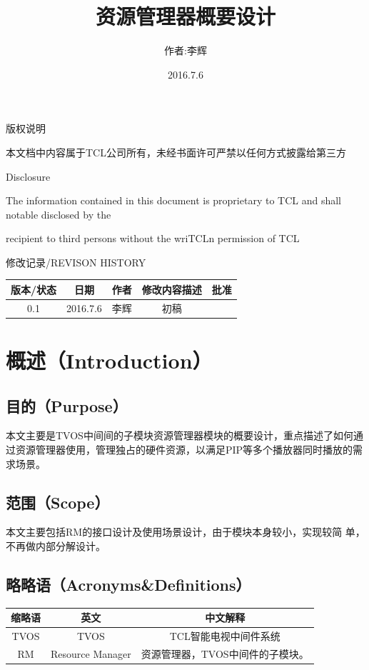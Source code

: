 \documentclass[UTF8]{ctexart}
\begin{document}
\title{资源管理器概要设计}
\author{作者:李辉}
\date{2016.7.6}
\maketitle
\thispagestyle{empty} 
\newpage
\pagestyle{plain}

\begin{center}

版权说明

本文档中内容属于TCL公司所有，未经书面许可严禁以任何方式披露给第三方

Disclosure

The information contained in this document is proprietary to TCL and shall notable disclosed by the

recipient to third persons without the wriTCLn permission of TCL

修改记录/REVISON HISTORY

\begin{tabular}{|c|c|c|c|c|}
\hline
版本/状态 & 日期 & 作者 & 修改内容描述          & 批准 \\
\hline
0.1 & 2016.7.6 & 李辉 & 初稿 & \\
\hline
\end{tabular}
\end{center}


\newpage
\tableofcontents
\newpage
\section{概述（Introduction）}
\subsection{目的（Purpose）}
本文主要是TVOS中间间的子模块资源管理器模块的概要设计，重点描述了如何通过资源管理器使用，管理独占的硬件资源，以满足PIP等多个播放器同时播放的需求场景。
\subsection{范围（Scope）}
		本文主要包括RM的接口设计及使用场景设计，由于模块本身较小，实现较简
		单，不再做内部分解设计。
\subsection{略略语（Acronyms\&Definitions）}
		\begin{tabular}{|c|c|c|}
		\hline
		缩略语&英文&中文解释\\
		\hline
		TVOS&TVOS&TCL智能电视中间件系统\\
		\hline
		RM&Resource Manager&资源管理器，TVOS中间件的子模块。\\
		\hline
		\end{tabular}
\end{document}
